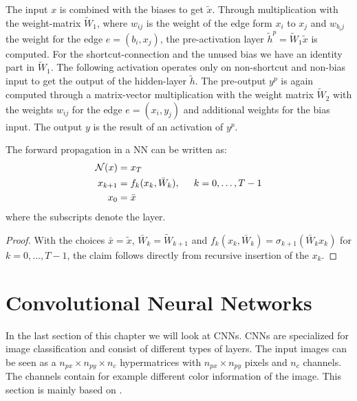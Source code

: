 \documentclass[a4paper, 12pt]{scrreprt} %
\begin{document}
\begin{myExample}
The input $x$ is combined with the biases to get $\tilde{x}$. Through multiplication with the weight-matrix $\tilde{W}_1$, where $w_{i j}$ is the weight of the edge form $x_i$ to $x_j$ and $w_{b_i j}$ the weight for the edge $e = (b_i, x_j)$, the pre-activation layer $\tilde{h}^p = \tilde{W}_1 \tilde{x}$ is computed. For the shortcut-connection and the unused bias we have an identity part in $\tilde{W}_1$. The following activation operates only on non-shortcut and non-bias input to get the output of the hidden-layer $\tilde{h}$.\newline
The pre-output $y^p$ is again computed through a matrix-vector multiplication with the weight matrix $\tilde{W}_2$ with the weights $w_{i j}$ for the edge $e=(x_i,y_j)$ and additional weights for the bias input. The output $y$ is the result of an activation of $y^p$.



\end{myExample} 

\begin{myLemma}
\label{lem:fwp}
The forward propagation in a \ac{NN} can be written as:
\begin{align*}
\mathcal{N}(x) &= x_T \\
x_{k+1} &= f_{k}(x_{k},\bar{W}_{k}) , \hspace{0.5cm}k = 0, \dots, T-1 \\
x_0 &= \bar{x} 
\end{align*}
where the subscripts denote the layer.
\end{myLemma}
\begin{proof}
With the choices $\bar{x} = \tilde{x}$, $\bar{W}_k = \tilde{W}_{k+1}$ and $f_k(x_k,\bar{W}_k)=\sigma_{k+1}(\bar{W}_k x_k)$ for $k=0, \dots, T-1$, the claim follows directly from recursive insertion of the $x_k$.
\end{proof}


\section{Convolutional Neural Networks}
\label{sec:CNN}
In the last section of this chapter we will look at \acp{CNN}. \acp{CNN} are specialized for image classification and consist of different types of layers. The input images can be seen as a $n_{px} \times n_{py} \times n_c$ hypermatrices with $n_{px} \times n_{py}$ pixels and $n_c$ channels. The channels contain for example different color information of the image. This section is mainly based on \cite{cs231n}.
\end{document}
